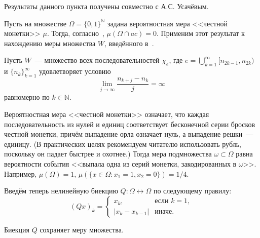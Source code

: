 Результаты данного пункта получены совместно с А.С. Усачёвым.

Пусть на множестве $\Omega=\{0,1\}^\mathbb{N}$ задана вероятностная мера <<честной монетки>> $\mu$.
Тогда, согласно~\cite{connor1990almost}, $\mu(\Omega\cap ac)=0$.
Применим этот результат к нахождению меры множества $W$,
введённого в~\cite[\S 5]{Semenov2014geomprops}.

Пусть $W$~--- множество всех последовательностей $\chi_e$, где $e =\bigcup_{k=1}^{\infty} [n_{2k-1}, n_{2k} )$
и $\{n_k \}_{k=1}^{\infty}$
удовлетворяет условию
\begin{equation}
	\label{eq:lim_j_n_kj_measure}
	\lim_{j\to\infty}\frac{n_{k+j} - n_k}{j} = \infty
\end{equation}
равномерно по $k \in \mathbb{N}$.

Вероятностная мера <<честной монетки>> означает,
что каждая последовательность из нулей и единиц соответствует бесконечной серии
бросков честной монетки, причём выпадение орла означает нуль, а выпадение решки~--- единицу.
(В практических целях рекомендуем читателю использовать рубль, поскольку он падает быстрее и охотнее.)
Тогда мера подмножества $\omega\subset\Omega$
равна вероятности события <<выпала одна из серий монетки, закодированных в $\omega$>>.
Например, $\mu(\Omega)=1$, $\mu(\{x\in\Omega:x_1=1, x_2=0\})=1/4$.

Введём теперь нелинейную биекцию $Q:\Omega\leftrightarrow\Omega$ по следующему правилу:
\begin{equation}
	(Qx)_k = \begin{cases}
		x_k, &\mbox{если~} k = 1,
		\\
		|x_k-x_{k-1}|&\mbox{иначе}.
	\end{cases}
\end{equation}

\begin{lemma}
	Биекция $Q$ сохраняет меру множества.
\end{lemma}

